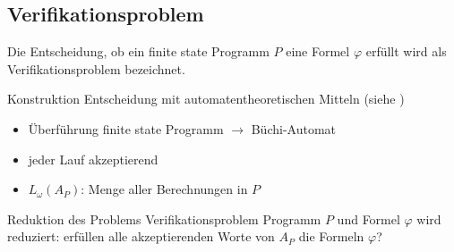 \subsection{Verifikationsproblem}
\begin{frame}{\insertsubsection}
    Die Entscheidung, ob ein finite state Programm $P$ eine Formel $\varphi$ erfüllt wird als {Verifikationsproblem} bezeichnet.
    \begin{block}{Konstruktion}
        Entscheidung mit automatentheoretischen Mitteln (siehe \cite[kap. 4.2]{vardi+96})
        \begin{itemize}
            \item Überführung finite state Programm $\rightarrow$ Büchi-Automat
            \item jeder Lauf akzeptierend
            \item $L_\omega(A_P)$: Menge aller Berechnungen in $P$
        \end{itemize} 
    \end{block}
    \pause
    \begin{block}{Reduktion des Problems}
        Verifikationsproblem Programm $P$ und Formel $\varphi$ wird reduziert:
        erfüllen alle akzeptierenden Worte von $A_P$ die Formeln $\varphi$?
    \end{block}
\end{frame}